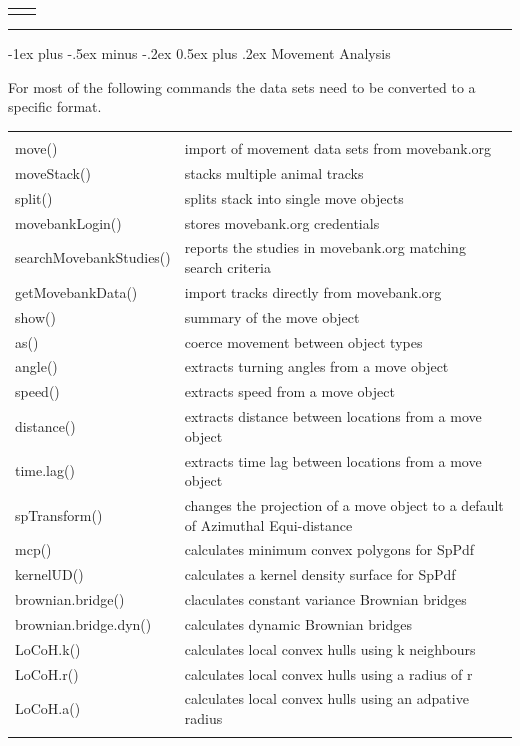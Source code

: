 \documentclass[10pt,landscape]{article}
\makeatletter
\renewcommand{\section}{\@startsection{section}{1}{0mm}%
                                {-1ex plus -.5ex minus -.2ex}%
                                {0.5ex plus .2ex}%
                                {\normalfont\large\bfseries}}
\makeatother
\begin{document}
\begin{multicols}{3}
\begin{tabular}{@{}p{\the\MyLen}%
                @{}p{\linewidth-\the\MyLen}@{}}
 & 

\end{tabular}


\rule{0.32\textwidth}{0.4pt}
\scriptsize


\section{Movement Analysis}

For most of the following commands the data sets need to be converted to a specific format.


\begin{tabular}{@{}p{\the\MyLen}%
                @{}p{\linewidth-\the\MyLen}@{}}
                & \\
move() & import of movement data sets from movebank.org  \\
moveStack() & stacks multiple animal tracks \\
split() & splits stack into single move objects \\
movebankLogin() & stores movebank.org credentials \\
searchMovebankStudies() & reports the studies in movebank.org matching search criteria\\
getMovebankData() & import tracks directly from movebank.org \\
show() & summary of the move object \\
as() & coerce movement between object types \\
angle() &  extracts turning angles from a move object\\
speed() & extracts speed from a move object \\  
distance() & extracts distance between locations from a move object \\
time.lag() & extracts time lag between locations from a move object \\
spTransform() & changes the projection of a move object to a default of Azimuthal Equi-distance \\
mcp() & calculates minimum convex polygons for SpPdf \\
kernelUD() & calculates a kernel density surface for SpPdf \\
brownian.bridge() & claculates constant variance Brownian bridges \\
brownian.bridge.dyn() & calculates dynamic Brownian bridges \\
LoCoH.k() & calculates local convex hulls using k neighbours \\
LoCoH.r() & calculates local convex hulls using a radius of r \\
LoCoH.a() & calculates local convex hulls using an adpative radius \\
& 


\end{tabular}
\end{multicols}
\end{document}
